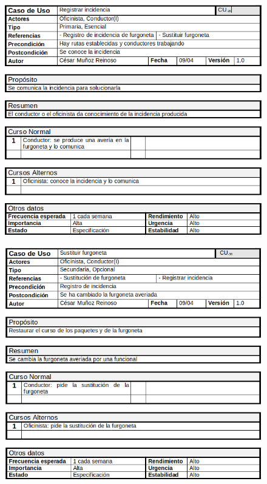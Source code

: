 \begin{figure}[H]
	\centering
	\includegraphics[width=16cm]{35}
\end{figure}
\begin{figure}[H]
	\centering
	\includegraphics[width=16cm]{36}
\end{figure}
